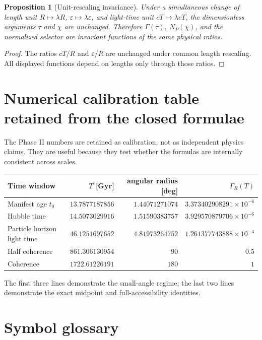 \documentclass[11pt,a4paper]{article}
\newtheorem{proposition}[theorem]{Proposition}
\begin{document}
\begin{proposition}[Unit-rescaling invariance]
Under a simultaneous change of length unit $R\mapsto \lambda R$, $\varepsilon\mapsto\lambda\varepsilon$, and light-time unit $cT\mapsto\lambda cT$, the dimensionless arguments $\tau$ and $\chi$ are unchanged.  Therefore $\Gamma(\tau)$, $N_P(\chi)$, and the normalized selector are invariant functions of the same physical ratios.
\end{proposition}
\begin{proof}
The ratios $cT/R$ and $\varepsilon/R$ are unchanged under common length rescaling.  All displayed functions depend on lengths only through those ratios.\end{proof}

\section{Numerical calibration table retained from the closed formulae}

The Phase II numbers are retained as calibration, not as independent physics claims.  They are useful because they test whether the formulas are internally consistent across scales.

\begin{center}
\begin{tabular}{lrrr}
\toprule
Time window & $T$ [Gyr] & angular radius [deg] & $\Gamma_R(T)$\\
\midrule
Manifest age $t_0$ & $13.7877187856$ & $1.44071271074$ & $3.373402908291\times10^{-6}$\\
Hubble time & $14.5073029916$ & $1.51590383757$ & $3.929570879706\times10^{-6}$\\
Particle horizon light time & $46.1251697652$ & $4.81973264752$ & $1.261377743888\times10^{-4}$\\
Half coherence & $861.306130954$ & $90$ & $0.5$\\
Coherence & $1722.61226191$ & $180$ & $1$\\
\bottomrule
\end{tabular}
\end{center}

The first three lines demonstrate the small-angle regime; the last two lines demonstrate the exact midpoint and full-accessibility identities.

\section{Symbol glossary}
\end{document}
